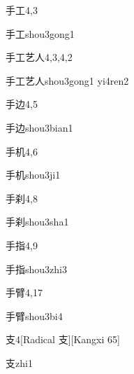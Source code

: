 \begin{entry}{手工}{4,3}
  \begin{phonetics}{手工}{shou3gong1}
  \end{phonetics}
\end{entry}

\begin{entry}{手工艺人}{4,3,4,2}
  \begin{phonetics}{手工艺人}{shou3gong1 yi4ren2}
  \end{phonetics}
\end{entry}

\begin{entry}{手边}{4,5}
  \begin{phonetics}{手边}{shou3bian1}
  \end{phonetics}
\end{entry}

\begin{entry}{手机}{4,6}
  \begin{phonetics}{手机}{shou3ji1}
  \end{phonetics}
\end{entry}

\begin{entry}{手刹}{4,8}
  \begin{phonetics}{手刹}{shou3sha1}
  \end{phonetics}
\end{entry}

\begin{entry}{手指}{4,9}
  \begin{phonetics}{手指}{shou3zhi3}
  \end{phonetics}
\end{entry}

\begin{entry}{手臂}{4,17}
  \begin{phonetics}{手臂}{shou3bi4}
  \end{phonetics}
\end{entry}

\begin{entry}{支}{4}[Radical 支][Kangxi 65]
  \begin{phonetics}{支}{zhi1}
  \end{phonetics}
\end{entry}


